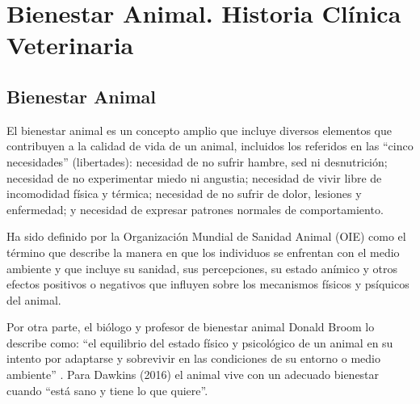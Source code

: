 \chapter{Bienestar Animal. Historia Clínica Veterinaria}\label{chapter:animalHealth}

\section{Bienestar Animal}
El bienestar animal es un concepto amplio que incluye diversos elementos que contribuyen a la calidad de vida de un animal, incluidos los referidos en las “cinco necesidades” (libertades): necesidad de no sufrir hambre, sed ni desnutrición; necesidad de no
experimentar miedo ni angustia; necesidad de vivir libre de incomodidad física y térmica; necesidad de no sufrir de dolor, lesiones y enfermedad; y necesidad de expresar patrones normales de comportamiento.


Ha sido definido por la Organización Mundial de Sanidad Animal (OIE) como el término que describe la manera en que los individuos se enfrentan con el medio ambiente y que incluye su sanidad, sus percepciones, su estado anímico y otros efectos positivos o negativos que influyen sobre los mecanismos físicos y psíquicos del animal.


Por otra parte, el biólogo y profesor de bienestar animal Donald Broom lo describe como: “el equilibrio del estado físico y psicológico de un animal en su intento por adaptarse y sobrevivir en las condiciones de su entorno o medio ambiente” . Para Dawkins (2016)  el animal vive con un adecuado bienestar cuando “está sano y tiene lo que quiere”.


